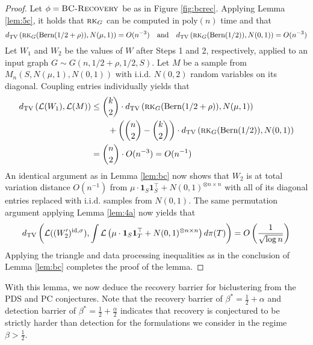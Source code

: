 \begin{proof}
Let $\phi = \textsc{BC-Recovery}$ be as in Figure \ref{fig:bcrec}. Applying Lemma \ref{lem:5c}, it holds that $\textsc{rk}_G$ can be computed in $\text{poly}(n)$ time and that
$$d_{\text{TV}}\left( \textsc{rk}_G(\text{Bern}(1/2 + \rho)), N(\mu, 1) \right) = O(n^{-3}) \quad \text{and} \quad d_{\text{TV}}\left( \textsc{rk}_G(\text{Bern}(1/2)), N(0, 1) \right) = O(n^{-3})$$
Let $W_1$ and $W_2$ be the values of $W$ after Steps 1 and 2, respectively, applied to an input graph $G \sim G(n, 1/2 + \rho, 1/2, S)$. Let $M$ be a sample from $M_n(S, N(\mu, 1), N(0, 1))$ with i.i.d. $N(0, 2)$ random variables on its diagonal. Coupling entries individually yields that
\begin{align*}
d_{\text{TV}}\left( \mathcal{L}(W_1), \mathcal{L}(M) \right) &\le \binom{k}{2} \cdot d_{\text{TV}}\left( \textsc{rk}_G(\text{Bern}(1/2 + \rho)), N(\mu, 1) \right) \\
&\quad \quad + \left( \binom{n}{2} - \binom{k}{2} \right) \cdot d_{\text{TV}}\left( \textsc{rk}_G(\text{Bern}(1/2)), N(0, 1) \right) \\
&= \binom{n}{2} \cdot O(n^{-3}) = O(n^{-1})
\end{align*}
An identical argument as in Lemma \ref{lem:bc} now shows that $W_2$ is at total variation distance $O(n^{-1})$ from $\mu \cdot \mathbf{1}_S \mathbf{1}_S^\top + N(0, 1)^{\otimes n \times n}$ with all of its diagonal entries replaced with i.i.d. samples from $N(0, 1)$. The same permutation argument applying Lemma \ref{lem:4a} now yields that
$$d_{\text{TV}}\left( \mathcal{L}((W'_2)^{\text{id}, \sigma}), \int \mathcal{L}\left( \mu \cdot \mathbf{1}_S \mathbf{1}_T^\top + N(0, 1)^{\otimes n \times n} \right) d\pi(T) \right) = O\left(\frac{1}{\sqrt{\log n}} \right)$$
Applying the triangle and data processing inequalities as in the conclusion of Lemma \ref{lem:bc} completes the proof of the lemma.
\end{proof}

With this lemma, we now deduce the recovery barrier for biclustering from the PDS and PC conjectures. Note that the recovery barrier of $\beta^* = \frac{1}{2} + \alpha$ and detection barrier of $\beta^* = \frac{1}{2} + \frac{\alpha}{2}$ indicates that recovery is conjectured to be strictly harder than detection for the formulations we consider in the regime $\beta > \frac{1}{2}$.

